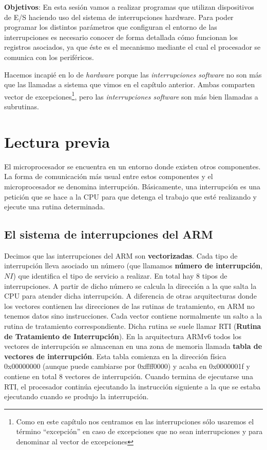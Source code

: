 %

\label{chp:Interrupciones}
\minitoc

{\bf Objetivos}: En esta sesión vamos a realizar programas que
utilizan dispositivos de E/S haciendo uso del sistema de
interrupciones hardware. Para poder programar los distintos parámetros
que configuran el entorno de las interrupciones es necesario conocer de
forma detallada cómo funcionan los registros asociados, ya que
éste es el mecanismo mediante el cual el procesador se
comunica con los periféricos.

Hacemos incapié en lo de {\it hardware} porque las
{\it interrupciones software} no son más que las llamadas a sistema
que vimos en el capítulo anterior. Ambas comparten vector de excepciones\footnote{Como
en este capítulo nos centramos en las interrupciones sólo usaremos el término ``excepción'' en caso de excepciones
que no sean interrupciones y para denominar al vector de excepciones},
pero las {\it interrupciones software} son más bien llamadas a subrutinas.

\section{Lectura previa}

El microprocesador se encuentra en un entorno donde existen otros
componentes. La forma de comunicación más usual entre estos
componentes y el microprocesador se denomina interrupción.
Básicamente, una interrupción es una petición que se hace a la CPU
para que detenga el trabajo que esté realizando y ejecute una rutina
determinada. 

\subsection{El sistema de interrupciones del ARM}

Decimos que las interrupciones del ARM son {\bf vectorizadas}.
Cada tipo de interrupción lleva asociado un número (que llamamos
{\bf número de interrupción}, $NI$) que identifica el tipo de servicio a
realizar. En total hay 8 tipos de interrupciones.
A partir de dicho número se calcula la dirección a la que salta la CPU
para atender dicha interrupción. A diferencia de otras arquitecturas
donde los vectores contienen las direcciones de las rutinas de
tratamiento, en ARM no tenemos datos sino instrucciones. Cada vector
contiene normalmente un salto a la rutina de tratamiento correspondiente.
Dicha rutina se suele llamar RTI ({\bf Rutina
de Tratamiento de Interrupción}). En la arquitectura ARMv6
todos los vectores de interrupción se almacenan en una zona de memoria
llamada {\bf tabla de vectores de interrupción}. Esta tabla comienza
en la dirección física 0x00000000 (aunque puede cambiarse por
0xffff0000) y acaba en 0x0000001f y contiene en total 8 vectores de
interrupción. Cuando termina de ejecutarse una RTI,
el procesador continúa ejecutando la instrucción siguiente a la que se
estaba ejecutando cuando se produjo la interrupción.

